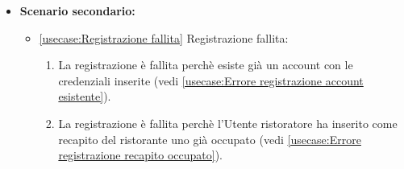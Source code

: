 \begin{itemize}
    \item \textbf{Scenario secondario:}
          \begin{itemize}
              \item \autoref{usecase:Registrazione fallita} Registrazione fallita:
              \begin{enumerate}
                  \item La registrazione è fallita perchè esiste già un account con le credenziali inserite (vedi \autoref{usecase:Errore registrazione account esistente}).
                  \item La registrazione è fallita perchè l'Utente ristoratore ha inserito come recapito del ristorante uno già occupato (vedi \autoref{usecase:Errore registrazione recapito occupato}).
              \end{enumerate}	
          \end{itemize}
	
\end{itemize}


